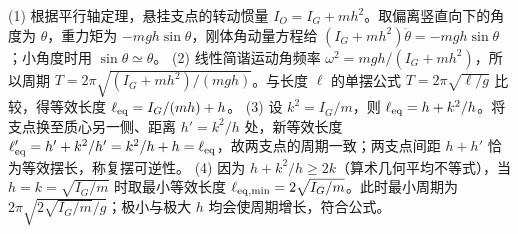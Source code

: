 (1) 根据平行轴定理，悬挂支点的转动惯量 \(I_O=I_G+mh^2\)。取偏离竖直向下的角度为 \(\theta\)，重力矩为 \(-mgh\sin\theta\)，刚体角动量方程给 \((I_G+mh^2)\ddot\theta=-mgh\sin\theta\)；小角度时用 \(\sin\theta\simeq\theta\)。
(2) 线性简谐运动角频率 \(\omega^2=mgh/(I_G+mh^2)\)，所以周期 \(T=2\pi\sqrt{(I_G+mh^2)/(mgh)}\)。与长度 \(\ell\) 的单摆公式 \(T=2\pi\sqrt{\ell/g}\) 比较，得等效长度 \(\ell_{\rm eq}=I_G/(mh)+h\)。
(3) 设 \(k^2=I_G/m\)，则 \(\ell_{\rm eq}=h+k^2/h\)。将支点换至质心另一侧、距离 \(h'=k^2/h\) 处，新等效长度 \(\ell_{\rm eq}'=h'+k^2/h'=k^2/h+h=\ell_{\rm eq}\)，故两支点的周期一致；两支点间距 \(h+h'\) 恰为等效摆长，称复摆可逆性。
(4) 因为 \(h+k^2/h\ge2k\)（算术几何平均不等式），当 \(h=k=\sqrt{I_G/m}\) 时取最小等效长度 \(\ell_{\rm eq,min}=2\sqrt{I_G/m}\)。此时最小周期为 \(2\pi\sqrt{2\sqrt{I_G/m}/g}\)；极小与极大 \(h\) 均会使周期增长，符合公式。
